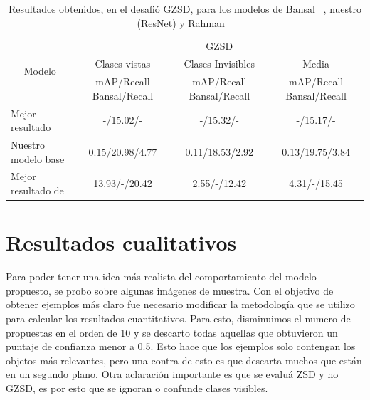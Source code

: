 \begin{table}[]
	\centering
	\resizebox{\textwidth}{!} {
		\begin{tabular}{|l|c|c|c|}
			\hline
			\multicolumn{1}{|c|}{\multirow{3}{*}{Modelo}} & \multicolumn{3}{c|}{GZSD}                                                       \\ \cline{2-4} 
			\multicolumn{1}{|c|}{}                        & Clases vistas             & Clases Invisibles        & Media                    \\ \cline{2-4} 
			\multicolumn{1}{|c|}{}                        & mAP/Recall Bansal/Recall  & mAP/Recall Bansal/Recall & mAP/Recall Bansal/Recall \\ \hline
			Mejor resultado \cite{bansal2018zero}                                        & -/15.02/-                 & -/15.32/-                & -/15.17/-                \\ \hline
			Nuestro modelo base                              & 0.15/20.98/4.77           & 0.11/18.53/2.92          & 0.13/19.75/3.84           \\ \hline
			Mejor resultado de \cite{rahman2020zero}     & 13.93/-/20.42             & 2.55/-/12.42             & 4.31/-/15.45             \\ \hline
		\end{tabular}
	}
	\caption{Resultados obtenidos, en el desafió GZSD, para los modelos de Bansal \etal~\cite{bansal2018zero}, nuestro (ResNet) y Rahman \etal~\cite{rahman2020zero}}
	\label{tab:resultados-gzsd}
\end{table}
\newpage

\section{Resultados cualitativos} \label{sec:resultadoscualitativos}

Para poder tener una idea más realista del comportamiento del modelo propuesto, se probo sobre algunas imágenes de muestra. Con el objetivo de obtener ejemplos más claro fue necesario modificar la metodología que se utilizo para calcular los resultados cuantitativos. Para esto, disminuimos el numero de propuestas en el orden de 10 y se descarto todas aquellas que obtuvieron un puntaje de confianza menor a 0.5. Esto hace que los ejemplos solo contengan los objetos más relevantes, pero una contra de esto es que descarta muchos que están en un segundo plano. Otra aclaración importante es que se evaluá ZSD y no GZSD, es por esto que se ignoran o confunde clases visibles. 

